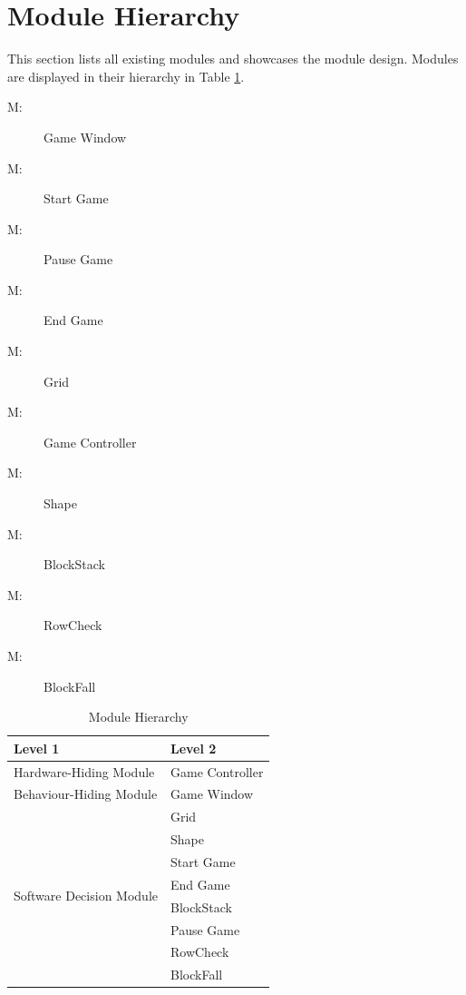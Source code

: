 \documentclass[12pt, titlepage]{article}
\newcounter{mnum}
\newcommand{\mthemnum}{M\themnum}
\begin{document}
\newpage
\section{Module Hierarchy} \label{SecMH}

This section lists all existing modules and showcases the module design. Modules are displayed in their hierarchy in Table \ref{TblMH}.

\begin{description}
\item [ \mthemnum \label{mHH}:] Game Window
\item [ \mthemnum \label{mHH}:] Start Game
\item [ \mthemnum \label{mHH}:] Pause Game
\item [ \mthemnum \label{mHH}:] End Game
\item [ \mthemnum \label{mHH}:] Grid
\item [ \mthemnum \label{mHH}:] Game Controller
\item [ \mthemnum \label{mHH}:] Shape
\item [ \mthemnum \label{mHH}:] BlockStack
\item [ \mthemnum \label{mHH}:] RowCheck
\item [ \mthemnum \label{mHH}:] BlockFall

\end{description}


\begin{table}[h!]
\centering
\begin{tabular}{p{} p{}}
\toprule
\textbf{Level 1} & \textbf{Level 2}\\
\midrule

{Hardware-Hiding Module} & Game Controller\\
\midrule

\multirow{1}{0.3\textwidth}{Behaviour-Hiding Module} 
& Game Window\\
\midrule

\multirow{8}{0.3\textwidth}{Software Decision Module} & {Grid}\\
& Shape\\
& Start Game\\
& End Game\\
& BlockStack\\
& Pause Game\\
& RowCheck\\
& BlockFall\\
\bottomrule

\end{tabular}
\caption{Module Hierarchy}
\label{TblMH}
\end{table}
\end{document}
